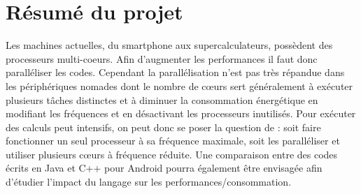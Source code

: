 \chapter{Résumé du projet}

Les machines actuelles, du smartphone aux supercalculateurs, possèdent des
processeurs multi-coeurs. Afin d'augmenter les performances il faut donc
paralléliser les codes. Cependant la parallélisation n'est pas très répandue dans
les périphériques nomades dont le nombre de cœurs sert généralement à
exécuter plusieurs tâches distinctes et à diminuer la consommation
énergétique en modifiant les fréquences et en désactivant les processeurs
inutilisés. Pour exécuter des calculs peut intensifs, on peut donc se poser la
question de : soit faire fonctionner un seul processeur à sa fréquence
maximale, soit les paralléliser et utiliser plusieurs cœurs à fréquence réduite.
Une comparaison entre des codes écrits en Java et C++ pour Android pourra
également être envisagée afin d'étudier l'impact du langage sur les
performances/consommation.